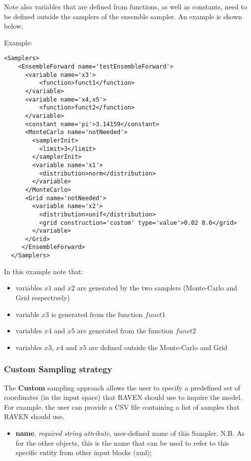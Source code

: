 Note also variables that are defined from functions, as well as constants, need to be defined outside the
samplers of the ensemble sampler. An example is shown below.

Example:
\begin{lstlisting}[style=XML]
  <Samplers>
    <EnsembleForward name='testEnsembleForward'>
      <variable name='x3'>
          <function>funct1</function>
      </variable>
      <variable name='x4,x5'>
          <function>funct2</function>
      </variable>
      <constant name='pi'>3.14159</constant>
      <MonteCarlo name='notNeeded'>
        <samplerInit>
          <limit>3</limit>
        </samplerInit>
        <variable name='x1'>
          <distribution>norm</distribution>
        </variable>
      </MonteCarlo>
      <Grid name='notNeeded'>
        <variable name='x2'>
          <distribution>unif</distribution>
          <grid construction='custom' type='value'>0.02 0.6</grid>
        </variable>
      </Grid>
     </EnsembleForward>
  </Samplers>
\end{lstlisting}

In this example note that:
\begin{itemize}
  \item variables $x1$ and $x2$ are generated by the two samplers (Monte-Carlo and Grid respectively)
  \item variable $x3$ is generated from the function $funct1$
  \item variables $x4$ and $x5$ are generated from the function $funct2$
  \item variables $x3$, $x4$ and $x5$ are defined outside the Monte-Carlo and Grid
\end{itemize}

\subsubsection{Custom Sampling strategy}
\label{subsubsubsec:CustomSampler}
The \textbf{Custom} sampling approach allows the user to specify a predefined set of coordinates (in the input space) that RAVEN should use to inquire the model. For example, the user can provide a CSV file containing a list of samples that RAVEN should use.
%
\attrsIntro
\vspace{-5mm}
\begin{itemize}
\itemsep0em
\item \textbf{name}, \textit{required string attribute}, user-defined name of this Sampler. N.B. As for the other objects, this is the name that can be used to refer to this specific entity from other input blocks (xml);
\end{itemize}
\vspace{-5mm}

